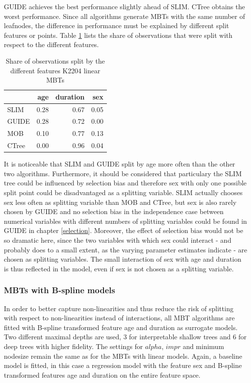 GUIDE achieves the best performance slightly ahead of SLIM. CTree obtains the worst performance.
Since all algorithms generate MBTs with the same number of leafnodes, the difference in performance must be explained by different split features or points.
Table \ref{tab:ins_k2204_lm_surrogates_share} lists the share of observations that were split with respect to the different features.

\begin{table}[!htb]

\centering \scriptsize
\begin{tabular}[t]{l|r|r|r}
\hline
& age & duration & sex\\
\hline
SLIM & 0.28 & 0.67 & 0.05\\
GUIDE & 0.28 & 0.72 & 0.00\\
MOB & 0.10 & 0.77 & 0.13\\
CTree & 0.00 & 0.96 & 0.04\\
\hline
\end{tabular}
\caption{Share of observations split by the different features K2204 linear MBTs}
\label{tab:ins_k2204_lm_surrogates_share}
\end{table}


It is noticeable that SLIM and GUIDE split by age more often than the other two algorithms.
Furthermore, it should be considered that particulary the SLIM tree could be influenced by selection bias and therefore sex with only one possible split point could be disadvantaged as a splitting variable. SLIM actually chooses sex less often as splitting variable than MOB and CTree, but sex is also rarely chosen by GUIDE and no selection bias in the independence case between numerical variables with different numbers of splitting variables could be found in GUIDE in chapter \ref{selection}. 
Moreover, the effect of selection bias would not be so dramatic here, since the two variables with which sex could interact - and probably does to a small extent, as the varying parameter estimates indicate - are chosen as splitting variables. The small interaction of sex with age and duration is thus reflected in the model, even if sex is not chosen as a splitting variable.

\subsubsection{MBTs with B-spline models}

In order to better capture non-linearities and thus reduce the risk of splitting with respect to non-linearities instead of interactions, all MBT algorithms are fitted with B-spline transformed feature age and duration as surrogate models. 
Two different maximal depths are used, 3 for interpretable shallow trees and 6 for deep trees with higher fidelity. The settings for $alpha$, $impr$ and minimum nodesize remain the same as for the MBTs with linear models.  Again, a baseline model is fitted, in this case a regression model with the feature sex and B-spline transformed features age and duration on the entire feature space. 

